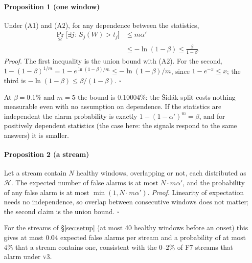 \documentclass{article}
\newcommand{\vthree}{\textsc{v3}}
\begin{document}
\paragraph{Proposition 1 (one window)}
Under (A1) and (A2), for any dependence between the statistics,
\begin{align*}
  \Pr_{\mathcal{H}}\bigl[\exists j:\ S_j(W)>t_j\bigr]
  &\le m\alpha' \\
  &\le -\ln(1-\beta) \le \frac{\beta}{1-\beta}.
\end{align*}
\emph{Proof.} The first inequality is the union bound with (A2). For the second,
$1-(1-\beta)^{1/m}=1-e^{\ln(1-\beta)/m}\le-\ln(1-\beta)/m$, since $1-e^{-x}\le x$; the
third is $-\ln(1-\beta)\le\beta/(1-\beta)$. \hfill$\square$

At $\beta=0.1\%$ and $m=5$ the bound is $0.10004\%$: the Šidák split costs nothing
measurable even with no assumption on dependence. If the statistics are
independent the alarm probability is exactly $1-(1-\alpha')^m=\beta$, and for
positively dependent statistics (the case here: the signals respond to the same
answers) it is smaller.

\paragraph{Proposition 2 (a stream)}
Let a stream contain $N$ healthy windows, overlapping or not, each distributed as
$\mathcal{H}$. The expected number of false alarms is at most
$N\cdot m\alpha'$, and the probability of any false alarm is at most
$\min(1,N\cdot m\alpha')$.
\emph{Proof.} Linearity of expectation needs no independence, so overlap between
consecutive windows does not matter; the second claim is the union bound. \hfill$\square$

For the streams of \S\ref{sec:setup} (at most 40 healthy windows before an onset)
this gives at most $0.04$ expected false alarms per stream and a probability of at
most 4\% that a stream contains one, consistent with the 0--2\% of F7 streams that
alarm under \vthree{}.
\end{document}
